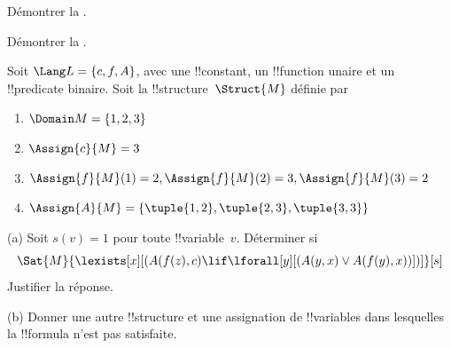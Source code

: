 \documentclass[../../../include/open-logic-section]{subfiles}
\begin{document}

\begin{prob}
  Démontrer la .
\end{prob}
\tagendprob


\begin{prob}
  Démontrer la .
\end{prob}
\tagendprob

\begin{prob}
Soit $\Lang L = \{c, f, A\}$, avec une !!{constant}, un
!!{function} unaire et un !!{predicate} binaire. Soit la
!!{structure}~$\Struct{M}$ définie par
\begin{enumerate}
\item $\Domain M = \{1, 2, 3\}$
\item $\Assign{c}{M} = 3$
\item $\Assign{f}{M}(1) = 2, \Assign{f}{M}(2) = 3, \Assign{f}{M}(3) = 2$
\item $\Assign{A}{M} = \{\tuple{1, 2}, \tuple{2, 3}, \tuple{3, 3}\}$
\end{enumerate}
(a) Soit $s(v) = 1$ pour toute !!{variable}~$v$. Déterminer si
\[
\Sat{M}{\lexists[x][(A(f(z), c) \lif \lforall[y][(A(y, x) \lor A(f(y),
      x))])]}[s]
\]
Justifier la réponse.

(b) Donner une autre !!{structure} et une assignation de
!!{variable}s dans lesquelles la !!{formula} n'est pas satisfaite.
\end{prob}
\end{document}
